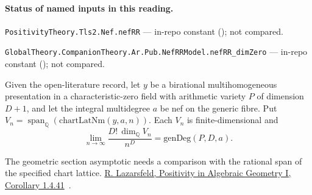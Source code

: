 

\paragraph{Status of named inputs in this reading.}
\noindent\nolinkurl{PositivityTheory.Tls2.Nef.nefRR} --- in-repo constant (); not compared.\par
\noindent\nolinkurl{GlobalTheory.CompanionTheory.Ar.Pub.NefRRModel.nefRR_dimZero} --- in-repo constant (); not compared.\par

\begin{formalstatement}\label{sub:T23}

Given the open-literature record, let $y$ be a birational
multihomogeneous presentation in a characteristic-zero field with
arithmetic variety $P$ of dimension $D+1$, and let the integral
multidegree $a$ be nef on the generic fibre. Put
$V_n=\operatorname{span}_{\mathbb Q}(\mathrm{chartLatNm}(y,a,n))$.
Each $V_n$ is finite-dimensional and
\[
 \lim_{n\to\infty} \frac{D!\,\dim_{\mathbb Q}V_n}{n^D}
       =\mathrm{genDeg}(P,D,a).
\]

\end{formalstatement}

\noindent The geometric section asymptotic needs a comparison with the rational span of the specified chart lattice. \href{https://doi.org/10.1007/978-3-642-18808-4}{R. Lazarsfeld, Positivity in Algebraic Geometry I, Corollary 1.4.41}~\cite{r21-laz}.
